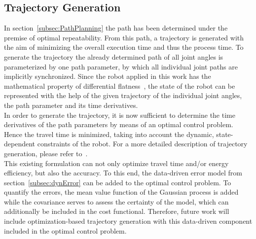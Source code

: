 \documentclass[5p,times,procedia]{elsarticle}
\begin{document}
\subsection{Trajectory Generation}
In section~\ref{subsec:PathPlanning} the path has been determined under the premise of optimal repeatability. From this path, a trajectory is generated with the aim of minimizing the overall execution time and thus the process time.
To generate the trajectory the already determined path of all joint angles is parameterized by one path parameter, by which all individual joint paths are implicitly synchronized.
Since the robot applied in this work has the mathematical property of differential flatness~\cite{Hoffmann23}, the state of the robot can be represented with the help of the given trajectory of the individual joint angles, the path parameter and its time derivatives.\\
In order to generate the trajectory, it is now sufficient to determine the time derivatives of the path parameters by means of an optimal control problem. 
Hence the travel time is minimized, taking into account the dynamic, state-dependent constraints of the robot. For a more detailed description of trajectory generation, please refer to~\cite{Kanagalingam24}. \\
This existing formulation can not only optimize travel time and/or energy efficiency, but also the accuracy.
To this end, the data-driven error model from section~\ref{subsec:dynError} can be added to the optimal control problem.
To quantify the errors, the mean value function of the Gaussian process is added while the covariance serves to assess the certainty of the model, which can additionally be included in the cost functional. Therefore, future work will include optimization-based trajectory generation with this data-driven component included in the optimal control problem.
%
\end{document}
